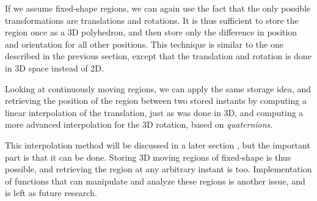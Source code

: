 If we assume fixed-shape regions, we can again use the fact that the only possible transformations are translations and rotations. It is thus sufficient to store the region once as a 3D polyhedron, and then store only the difference in position and orientation for all other positions. This technique is similar to the one described in the previous section, except that the translation and rotation is done in 3D space instead of 2D.

Looking at continuously moving regions, we can apply the same storage idea, and retrieving the position of the region between two stored instants by computing a linear interpolation of the translation, just as was done in 3D, and computing a more advanced interpolation for the 3D rotation, based on \textit{quaternions}.

This interpolation method will be discussed in a later section , but the important part is that it can be done. Storing 3D moving regions of fixed-shape is thus possible, and retrieving the region at any arbitrary instant is too. Implementation of functions that can manipulate and analyze these regions is another issue, and is left as future research.